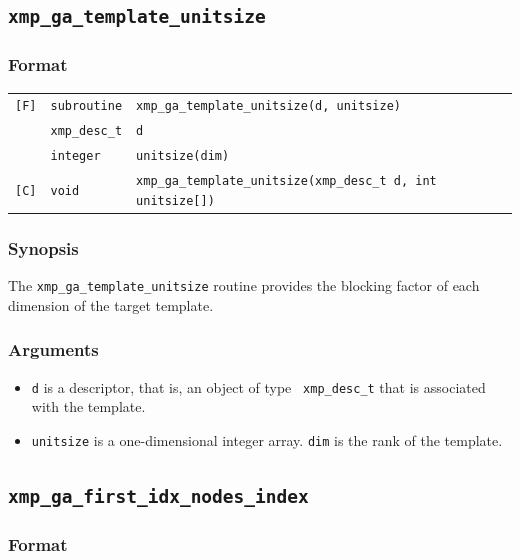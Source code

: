 \subsection{\tt xmp\_ga\_template\_unitsize}

\subsubsection*{Format}

\begin{tabular}{lll}

\verb![F]!&  {\tt subroutine}& {\tt xmp\_ga\_template\_unitsize(d, unitsize)}\\
          & {\tt xmp\_desc\_t} & {\tt d}\\
          & {\tt integer} & {\tt unitsize(dim)}\\

\verb![C]!&  {\tt void}& {\tt xmp\_ga\_template\_unitsize(xmp\_desc\_t d, int unitsize[])}\\

\end{tabular}

\subsubsection*{Synopsis}

The {\tt xmp\_ga\_template\_unitsize} routine provides the blocking
factor of each dimension of the target template.

\subsubsection*{Arguments}

\begin{itemize}
 \item {\tt d} is a descriptor, that is, an object of type {\tt
       xmp\_desc\_t} that is associated with the template.
 \item {\tt unitsize} is a one-dimensional integer array. {\tt dim} is
       the rank of the template.
\end{itemize}


\subsection{\tt xmp\_ga\_first\_idx\_nodes\_index}

\subsubsection*{Format}

